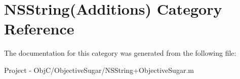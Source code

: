 \hypertarget{category_n_s_string_07_additions_08}{}\section{N\+S\+String(Additions) Category Reference}
\label{category_n_s_string_07_additions_08}


The documentation for this category was generated from the following file\+:\begin{DoxyCompactItemize}
\item 
Project -\/ Obj\+C/\+Objective\+Sugar/N\+S\+String+\+Objective\+Sugar.\+m\end{DoxyCompactItemize}
